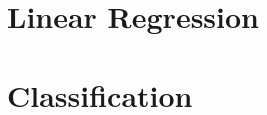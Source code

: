 \documentclass{article}
\begin{document}
\setlength{\parindent}{0em} 

\newpage

\tableofcontents
\newpage


\section{Linear Regression} \label{sec:linear_regression}




\section{Classification} \label{sec:logistic_regression}







\newpage
 

\end{document}
